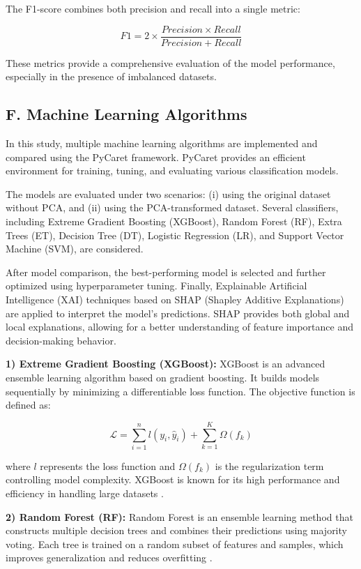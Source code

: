 \documentclass[conference]{IEEEtran}
\begin{document}
The F1-score combines both precision and recall into a single metric:

\begin{equation}
F1 = 2 \times \frac{Precision \times Recall}{Precision + Recall}
\end{equation}

These metrics provide a comprehensive evaluation of the model performance, especially in the presence of imbalanced datasets.

\subsection{F. Machine Learning Algorithms}

In this study, multiple machine learning algorithms are implemented and compared using the PyCaret framework. PyCaret provides an efficient environment for training, tuning, and evaluating various classification models.

The models are evaluated under two scenarios: (i) using the original dataset without PCA, and (ii) using the PCA-transformed dataset. Several classifiers, including Extreme Gradient Boosting (XGBoost), Random Forest (RF), Extra Trees (ET), Decision Tree (DT), Logistic Regression (LR), and Support Vector Machine (SVM), are considered.

After model comparison, the best-performing model is selected and further optimized using hyperparameter tuning. Finally, Explainable Artificial Intelligence (XAI) techniques based on SHAP (Shapley Additive Explanations) are applied to interpret the model's predictions. SHAP provides both global and local explanations, allowing for a better understanding of feature importance and decision-making behavior.

\textbf{1) Extreme Gradient Boosting (XGBoost):}  
XGBoost is an advanced ensemble learning algorithm based on gradient boosting. It builds models sequentially by minimizing a differentiable loss function. The objective function is defined as:

\begin{equation}
\mathcal{L} = \sum_{i=1}^{n} l(y_i, \hat{y}_i) + \sum_{k=1}^{K} \Omega(f_k)
\end{equation}

where $l$ represents the loss function and $\Omega(f_k)$ is the regularization term controlling model complexity. XGBoost is known for its high performance and efficiency in handling large datasets \cite{b4}.

\textbf{2) Random Forest (RF):}  
Random Forest is an ensemble learning method that constructs multiple decision trees and combines their predictions using majority voting. Each tree is trained on a random subset of features and samples, which improves generalization and reduces overfitting \cite{b6}.
\end{document}
